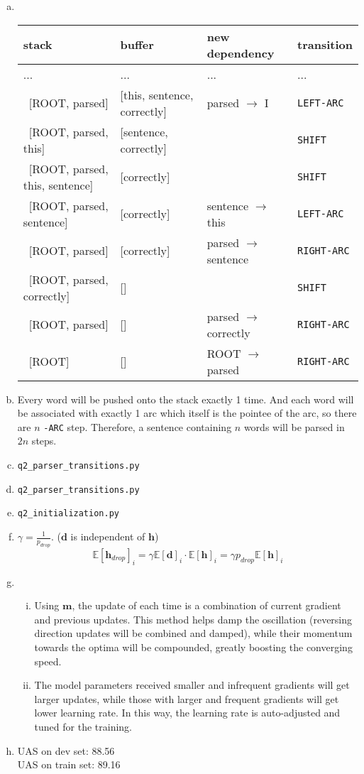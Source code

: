 \documentclass[11pt]{article}
\newcommand{\bbE}{{\mathbb E}}
\begin{document}
\begin{enumerate}[(a)]
\item \ 
  \begin{table}[H]
    \centering
    \begin{tabular}{l|l|l|l}
      stack&buffer&new dependency&transition \\ \hline
      ... & ... & ... & ... \\
      \ [ROOT, parsed] & [this, sentence, correctly] & parsed $\rightarrow$ I & \verb|LEFT-ARC| \\
      \ [ROOT, parsed, this] & [sentence, correctly] &   & \verb|SHIFT| \\
      \ [ROOT, parsed, this, sentence] & [correctly] &  &  \verb|SHIFT| \\
      \ [ROOT, parsed, sentence] & [correctly] & sentence $\rightarrow$ this & \verb|LEFT-ARC| \\
      \ [ROOT, parsed] & [correctly] & parsed $\rightarrow$ sentence & \verb|RIGHT-ARC| \\
      \ [ROOT, parsed, correctly] & [] &  &  \verb|SHIFT| \\
      \ [ROOT, parsed] & [] & parsed $\rightarrow$ correctly &  \verb|RIGHT-ARC| \\
      \ [ROOT] & [] & ROOT $\rightarrow$ parsed & \verb|RIGHT-ARC|
    \end{tabular}
  \end{table}
\item Every word will be pushed onto the stack exactly 1 time. And each word
  will be associated with exactly 1 arc which itself is the pointee of the arc,
  so there are $n$ \verb|-ARC| step. Therefore, a sentence containing $n$ words
  will be parsed in $2n$ steps.
\item \verb|q2_parser_transitions.py|
\item \verb|q2_parser_transitions.py|
\item \verb|q2_initialization.py|
\item $\gamma = \frac{1}{p_{drop}}$. ($\bm{d}$ is independent of $\bm{h}$)
  \[
    \bbE[\bm{h}_{drop}]_i = \gamma\bbE[\bm{d}]_i \cdot \bbE[\bm{h}]_i = \gamma
    p_{drop} \bbE[\bm{h}]_i
  \]
\item
  \begin{enumerate}[(i)]
  \item Using $\bm{m}$, the update of each time is a combination of current
    gradient and previous updates. This method helps damp the oscillation
    (reversing direction updates will be combined and damped), while their
    momentum towards the optima will be compounded, greatly boosting the
    converging speed.
  \item The model parameters received smaller and infrequent gradients will get
    larger updates, while those with larger and frequent gradients will get
    lower learning rate. In this way, the learning rate is auto-adjusted and
    tuned for the training.
  \end{enumerate}
\item UAS on dev set: 88.56 \\
  UAS on train set: 89.16 \\
  
  
\end{enumerate}
\end{document}
